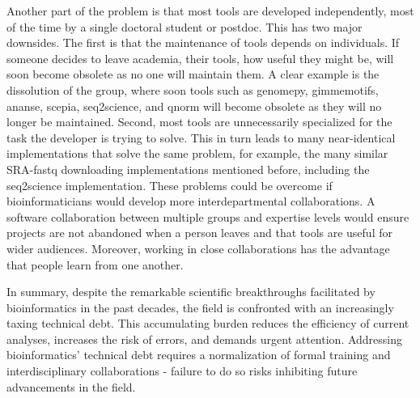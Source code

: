 Another part of the problem is that most tools are developed independently, most of the time by a single doctoral student or postdoc. This has two major downsides. The first is that the maintenance of tools depends on individuals. If someone decides to leave academia, their tools, how useful they might be, will soon become obsolete as no one will maintain them. A clear example is the dissolution of the  group, where soon tools such as genomepy\cite{genomepy}, gimmemotifs\cite{Bruse_2018}, ananse\cite{Xu_2020}, scepia, seq2science\cite{seq2science}, and qnorm\cite{qnorm} will become obsolete as they will no longer be maintained. Second, most tools are unnecessarily specialized for the task the developer is trying to solve. This in turn leads to many near-identical implementations that solve the same problem, for example, the many similar SRA-fastq downloading implementations mentioned before, including the seq2science implementation. These problems could be overcome if bioinformaticians would develop more interdepartmental collaborations. A software collaboration between multiple groups and expertise levels would ensure projects are not abandoned when a person leaves and that tools are useful for wider audiences. Moreover, working in close collaborations has the advantage that people learn from one another.

In summary, despite the remarkable scientific breakthroughs facilitated by bioinformatics in the past decades, the field is confronted with an increasingly taxing technical debt. This accumulating burden reduces the efficiency of current analyses, increases the risk of errors, and demands urgent attention. Addressing bioinformatics' technical debt requires a normalization of formal training and interdisciplinary collaborations - failure to do so risks inhibiting future advancements in the field.

